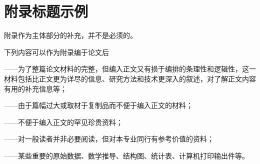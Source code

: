 \chapter{附录标题示例}

附录作为主体部分的补充，并不是必须的。

下列内容可以作为附录编于论文后

——为了整篇论文材料的完整，但编入正文又有损于编排的条理性和逻辑性，这一材料包括比正文更为详尽的信息、研究方法和技术更深入的叙述，对了解正文内容有用的补充信息等；

——由于篇幅过大或取材于复制品而不便于编入正文的材料；

——不便于编入正文的罕见珍贵资料；

——对一般读者并非必要阅读，但对本专业同行有参考价值的资料；

——某些重要的原始数据、数学推导、结构图、统计表、计算机打印输出件等。